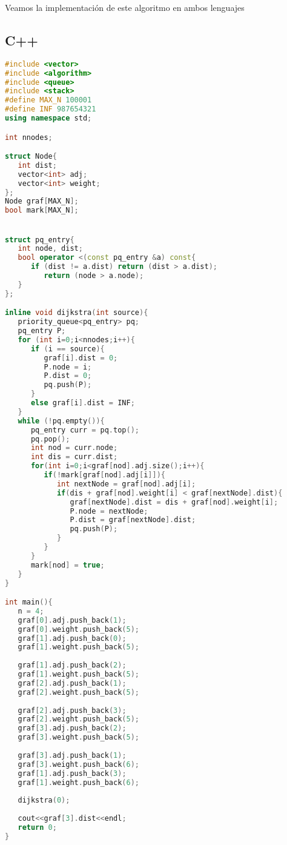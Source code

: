 Veamos la implementación de este algoritmo en ambos lenguajes

\subsection{C++}

\begin{lstlisting}[language=C++]
#include <vector>
#include <algorithm>
#include <queue>
#include <stack>
#define MAX_N 100001
#define INF 987654321
using namespace std;

int nnodes;

struct Node{
   int dist;
   vector<int> adj;
   vector<int> weight;
};
Node graf[MAX_N];
bool mark[MAX_N];


struct pq_entry{
   int node, dist;
   bool operator <(const pq_entry &a) const{
      if (dist != a.dist) return (dist > a.dist);
         return (node > a.node);
   }
};

inline void dijkstra(int source){
   priority_queue<pq_entry> pq;
   pq_entry P;
   for (int i=0;i<nnodes;i++){
      if (i == source){
         graf[i].dist = 0;
         P.node = i;
         P.dist = 0;
         pq.push(P);
      }
      else graf[i].dist = INF;
   }
   while (!pq.empty()){
      pq_entry curr = pq.top();
      pq.pop();
      int nod = curr.node;
      int dis = curr.dist;
      for(int i=0;i<graf[nod].adj.size();i++){
         if(!mark[graf[nod].adj[i]]){
            int nextNode = graf[nod].adj[i];
            if(dis + graf[nod].weight[i] < graf[nextNode].dist){
               graf[nextNode].dist = dis + graf[nod].weight[i];
               P.node = nextNode;
               P.dist = graf[nextNode].dist;
               pq.push(P);
            }
         }
      }
      mark[nod] = true;
   }
}

int main(){
   n = 4;
   graf[0].adj.push_back(1);
   graf[0].weight.push_back(5);
   graf[1].adj.push_back(0);
   graf[1].weight.push_back(5);
	
   graf[1].adj.push_back(2);
   graf[1].weight.push_back(5);
   graf[2].adj.push_back(1);
   graf[2].weight.push_back(5);
	
   graf[2].adj.push_back(3);
   graf[2].weight.push_back(5);
   graf[3].adj.push_back(2);
   graf[3].weight.push_back(5);
	
   graf[3].adj.push_back(1);
   graf[3].weight.push_back(6);
   graf[1].adj.push_back(3);
   graf[1].weight.push_back(6);
	
   dijkstra(0);
	
   cout<<graf[3].dist<<endl;
   return 0;
}
\end{lstlisting}

